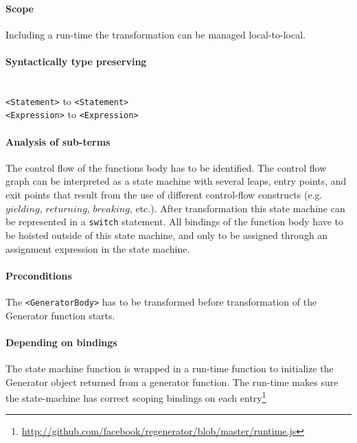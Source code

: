 \paragraph{Scope}
Including a run-time the transformation can be managed local-to-local.

\paragraph{Syntactically type preserving} \mbox{}\\
\lstinline$<Statement>$ to \lstinline$<Statement>$ \\
\lstinline$<Expression>$ to \lstinline$<Expression>$

\paragraph{Analysis of sub-terms}
The control flow of the functions body has to be identified. The control flow graph can be interpreted as a state machine with several leaps, entry points, and exit points that result from the use of different control-flow constructs (e.g. $yielding$, $returning$, $breaking$, etc.). After transformation this state machine can be represented in a \lstinline$switch$ statement. All bindings of the function body have to be hoisted outside of this state machine, and only to be assigned through an assignment expression in the state machine.

\paragraph{Preconditions}
The \lstinline$<GeneratorBody>$ has to be transformed before transformation of the Generator function starts.

\paragraph{Depending on bindings}
The state machine function is wrapped in a run-time function to initialize the Generator object returned from a generator function. The run-time makes sure the state-machine has correct scoping bindings on each entry\footnote{\url{http://github.com/facebook/regenerator/blob/master/runtime.js}}

